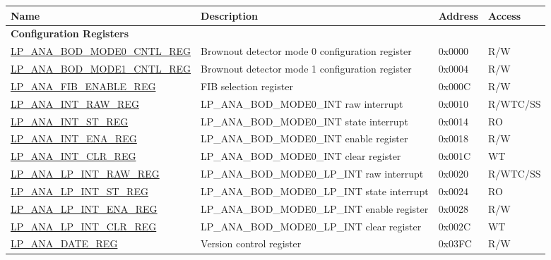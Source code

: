 \begin{longtable}{ | l | p{7.2cm} | l | l | }
\hline\rowcolor{lightgray}
\textbf{Name} & \textbf{Description} &  \textbf{Address} & \textbf{Access} \\ \hline
\endhead
\multicolumn{4}{|l|}{\textbf{Configuration Registers}} \\ \hline
\hyperref[regdesc:LPANABODMODE0CNTLREG]{LP\_ANA\_BOD\_MODE0\_CNTL\_REG} & Brownout detector mode 0 configuration register & 0x0000 & R/W \\ \hline\hyperref[regdesc:LPANABODMODE1CNTLREG]{LP\_ANA\_BOD\_MODE1\_CNTL\_REG} &  Brownout detector mode 1 configuration register & 0x0004 & R/W \\  \hline\hyperref[regdesc:LPANAFIBENABLEREG]{LP\_ANA\_FIB\_ENABLE\_REG} & FIB selection register & 0x000C & R/W \\ \hline\hyperref[regdesc:LPANAINTRAWREG]{LP\_ANA\_INT\_RAW\_REG} &  LP\_ANA\_BOD\_MODE0\_INT raw interrupt & 0x0010 & R/WTC/SS \\ \hline\hyperref[regdesc:LPANAINTSTREG]{LP\_ANA\_INT\_ST\_REG} & LP\_ANA\_BOD\_MODE0\_INT state interrupt & 0x0014 & RO \\ \hline\hyperref[regdesc:LPANAINTENAREG]{LP\_ANA\_INT\_ENA\_REG} & LP\_ANA\_BOD\_MODE0\_INT enable register & 0x0018 & R/W \\ \hline\hyperref[regdesc:LPANAINTCLRREG]{LP\_ANA\_INT\_CLR\_REG} & LP\_ANA\_BOD\_MODE0\_INT clear register & 0x001C & WT \\ \hline\hyperref[regdesc:LPANALPINTRAWREG]{LP\_ANA\_LP\_INT\_RAW\_REG} & LP\_ANA\_BOD\_MODE0\_LP\_INT raw interrupt & 0x0020 & R/WTC/SS \\ \hline\hyperref[regdesc:LPANALPINTSTREG]{LP\_ANA\_LP\_INT\_ST\_REG} & LP\_ANA\_BOD\_MODE0\_LP\_INT state interrupt & 0x0024 & RO \\ \hline\hyperref[regdesc:LPANALPINTENAREG]{LP\_ANA\_LP\_INT\_ENA\_REG} & LP\_ANA\_BOD\_MODE0\_LP\_INT enable register & 0x0028 & R/W \\ \hline\hyperref[regdesc:LPANALPINTCLRREG]{LP\_ANA\_LP\_INT\_CLR\_REG} & LP\_ANA\_BOD\_MODE0\_LP\_INT  clear register & 0x002C & WT \\ \hline\hyperref[regdesc:LPANADATEREG]{LP\_ANA\_DATE\_REG} & Version control register & 0x03FC & R/W \\ \hline\end{longtable}

